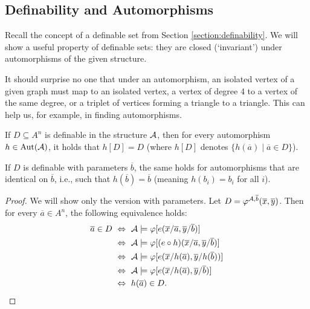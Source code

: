 \subsection{Definability and Automorphisms}

Recall the concept of a definable set from Section \ref{section:definability}. We will show a useful property of definable sets: they are closed (`invariant') under automorphisms of the given structure.

It should surprise no one that under an automorphism, an isolated vertex of a given graph must map to an isolated vertex, a vertex of degree 4 to a vertex of the same degree, or a triplet of vertices forming a triangle to a triangle. This can help us, for example, in finding automorphisms.

\begin{proposition}
    If $D \subseteq A^n$ is definable in the structure $\mathcal{A}$, then for every automorphism $h \in \operatorname{Aut}(\mathcal{A})$, it holds that $h[D] = D$ (where $h[D]$ denotes $\{h(\overline{a}) \mid \overline{a} \in D\}$).

    If $D$ is definable with parameters $\overline{b}$, the same holds for automorphisms that are identical on $\overline{b}$, i.e., such that $h(\overline{b}) = \overline{b}$ (meaning $h(b_i) = b_i$ for all $i$).
\end{proposition}
\begin{proof}
    We will show only the version with parameters. Let $D = \varphi^{\mathcal{A}, \overline{b}}(\overline{x}, \overline{y})$. Then for every $\overline{a} \in A^n$, the following equivalence holds:
\begin{align*}
\overline{a} \in D\ 
&\Leftrightarrow\ \A \models \varphi[e(\overline{x}/\overline{a}, \overline{y}/\overline{b})] \\
&\Leftrightarrow\ \A \models \varphi[(e \circ h)(\overline{x}/\overline{a}, \overline{y}/\overline{b})] \\
&\Leftrightarrow\ \A \models \varphi[e(\overline{x}/h(\overline{a}), \overline{y}/h(\overline{b}))] \\
&\Leftrightarrow\ \A \models \varphi[e(\overline{x}/h(\overline{a}), \overline{y}/\overline{b})] \\
&\Leftrightarrow\ h(\overline{a}) \in D.
\end{align*}
\end{proof}

